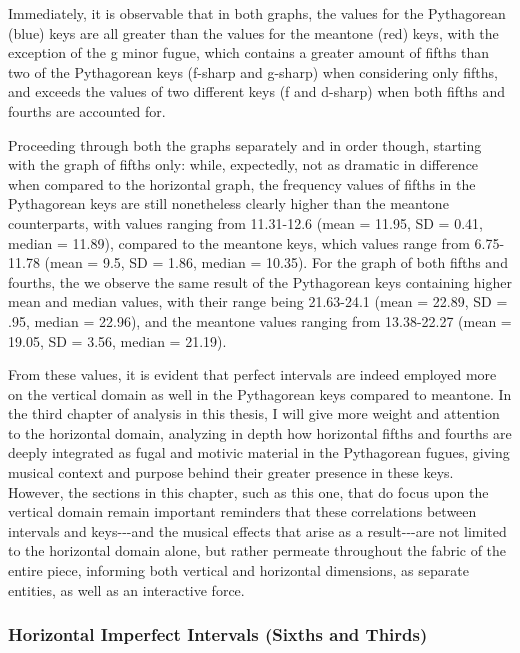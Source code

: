     \begin{center}
    \end{center}
    
    Immediately, it is observable that in both graphs, the values for the
Pythagorean (blue) keys are all greater than the values for the meantone
(red) keys, with the exception of the g minor fugue, which contains a
greater amount of fifths than two of the Pythagorean keys (f-sharp and
g-sharp) when considering only fifths, and exceeds the values of two
different keys (f and d-sharp) when both fifths and fourths are
accounted for.

Proceeding through both the graphs separately and in order though,
starting with the graph of fifths only: while, expectedly, not as
dramatic in difference when compared to the horizontal graph, the
frequency values of fifths in the Pythagorean keys are still nonetheless
clearly higher than the meantone counterparts, with values ranging from
11.31-12.6 (mean = 11.95, SD = 0.41, median = 11.89), compared to the
meantone keys, which values range from 6.75-11.78 (mean = 9.5, SD =
1.86, median = 10.35). For the graph of both fifths and fourths, the we
observe the same result of the Pythagorean keys containing higher mean
and median values, with their range being 21.63-24.1 (mean = 22.89, SD =
.95, median = 22.96), and the meantone values ranging from 13.38-22.27
(mean = 19.05, SD = 3.56, median = 21.19).

From these values, it is evident that perfect intervals are indeed
employed more on the vertical domain as well in the Pythagorean keys
compared to meantone. In the third chapter of analysis in this thesis, I
will give more weight and attention to the horizontal domain, analyzing
in depth how horizontal fifths and fourths are deeply integrated as
fugal and motivic material in the Pythagorean fugues, giving musical
context and purpose behind their greater presence in these keys.
However, the sections in this chapter, such as this one, that do focus
upon the vertical domain remain important reminders that these
correlations between intervals and keys-\/-\/-and the musical effects
that arise as a result-\/-\/-are not limited to the horizontal domain
alone, but rather permeate throughout the fabric of the entire piece,
informing both vertical and horizontal dimensions, as separate entities,
as well as an interactive force.

    \subsubsection{Horizontal Imperfect Intervals (Sixths and
Thirds)}\label{horizontal-imperfect-intervals-sixths-and-thirds}

